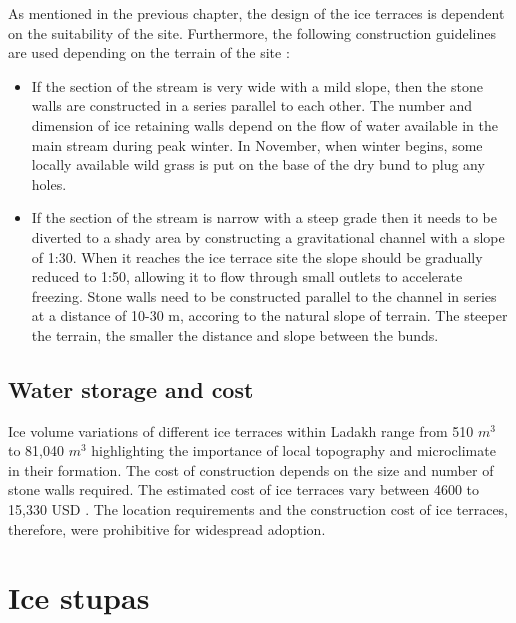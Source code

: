 As mentioned in the previous chapter, the design of the ice terraces is dependent on the suitability of the
site. Furthermore, the following construction guidelines are used depending on the terrain of the site
\cite{norphelSnowWaterHarvesting2015}:

\begin{itemize}

  \item If the section of the stream is very wide with a mild slope, then the stone walls are
    constructed in a series parallel to each other. The number and dimension of ice retaining walls depend on
    the flow of water available in the main stream during peak winter. In November, when winter begins, some
    locally available wild grass is put on the base of the dry bund to plug any holes.

  \item If the section of the stream is narrow with a steep grade then it needs to be diverted to a shady area
    by constructing a gravitational channel with a slope of 1:30. When it reaches the ice terrace site the slope
    should be gradually reduced to 1:50, allowing it to flow through small outlets to accelerate freezing. Stone
    walls need to be constructed parallel to the channel in series at a distance of 10-30 m, accoring to the
    natural slope of terrain. The steeper the terrain, the smaller the distance and slope between the bunds.

\end{itemize}


\subsection{Water storage and cost}

Ice volume variations of different ice terraces within Ladakh \citep{nusserSociohydrologyArtificialGlaciers2019,
norphelSnowWaterHarvesting2015} range from 510 $m^3$ to 81,040 $m^3$ highlighting the importance of local topography and
microclimate in their formation. The cost of construction depends on the size and number of stone walls
required. The estimated cost of ice terraces vary between 4600 to 15,330 USD
\cite{nusserSociohydrologyArtificialGlaciers2019}. The location requirements and the construction cost of ice
terraces, therefore, were prohibitive for widespread adoption.

\section{Ice stupas}

